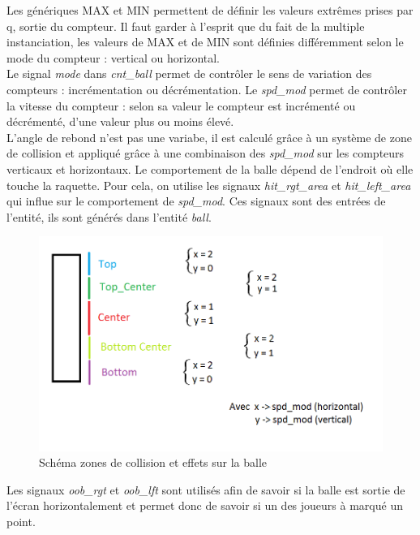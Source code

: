 Les génériques MAX et MIN permettent de définir les valeurs extrêmes prises par q, sortie du compteur. Il faut garder à l'esprit que du fait de la multiple instanciation, les valeurs de MAX et de MIN sont définies différemment selon le mode du compteur : vertical ou horizontal.\\

Le signal \emph{mode} dans \emph{cnt\_ball} permet de contrôler le sens de variation des compteurs : incrémentation ou décrémentation. Le \emph{spd\_mod} permet de contrôler la vitesse du compteur : selon sa valeur le compteur est incrémenté ou décrémenté, d'une valeur plus ou moins élevé.\\

L'angle de rebond n'est pas une variabe, il est calculé grâce à un système de zone de collision et appliqué grâce à une combinaison des \emph{spd\_mod} sur les compteurs verticaux et horizontaux. Le comportement de la balle dépend de l'endroit où elle touche la raquette. Pour cela, on utilise les signaux \emph{hit\_rgt\_area} et \emph{hit\_left\_area} qui influe sur le comportement de \emph{spd\_mod}. Ces signaux sont des entrées de l'entité, ils sont générés dans l'entité \emph{ball}.\\

\newpage
\begin{figure}[h!]
	\centering
	\includegraphics[scale=0.5]{images/collisions.png}
	\caption{Schéma zones de collision et effets sur la balle}
	\label{fig:collisions}
\end{figure}

Les signaux \emph{oob\_rgt} et \emph{oob\_lft} sont utilisés afin de savoir si la balle est sortie de l'écran horizontalement et permet donc de savoir si un des joueurs à marqué un point.

